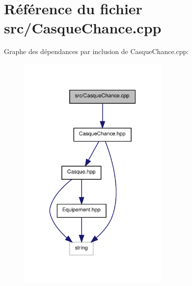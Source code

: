 \section{Référence du fichier src/\-Casque\-Chance.cpp}
\label{_casque_chance_8cpp}
Graphe des dépendances par inclusion de Casque\-Chance.\-cpp\-:\nopagebreak
\begin{figure}[H]
\begin{center}
\leavevmode
\includegraphics[width=211pt]{_casque_chance_8cpp__incl}
\end{center}
\end{figure}
